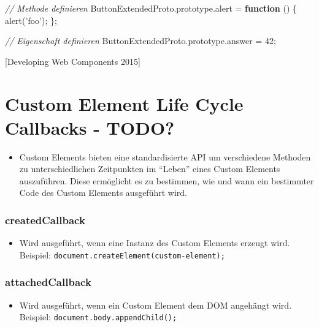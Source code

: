 \documentclass[11pt,a4paper]{report}
\newenvironment{Shaded}{}{}
\newcommand{\KeywordTok}[1]{\textcolor[rgb]{0.00,0.44,0.13}{\textbf{{#1}}}}
\newcommand{\DecValTok}[1]{\textcolor[rgb]{0.25,0.63,0.44}{{#1}}}
\newcommand{\StringTok}[1]{\textcolor[rgb]{0.25,0.44,0.63}{{#1}}}
\newcommand{\CommentTok}[1]{\textcolor[rgb]{0.38,0.63,0.69}{\textit{{#1}}}}
\newcommand{\VariableTok}[1]{\textcolor[rgb]{0.10,0.09,0.49}{{#1}}}
\newcommand{\OperatorTok}[1]{\textcolor[rgb]{0.40,0.40,0.40}{{#1}}}
\newcommand{\AttributeTok}[1]{\textcolor[rgb]{0.49,0.56,0.16}{{#1}}}
\newcommand{\NormalTok}[1]{{#1}}
\providecommand{\tightlist}{%
  \setlength{\itemsep}{0pt}\setlength{\parskip}{0pt}}
\begin{document}
\begin{Shaded}
\begin{Highlighting}[]
\CommentTok{// Methode definieren}
\VariableTok{ButtonExtendedProto}\NormalTok{.}\VariableTok{prototype}\NormalTok{.}\AttributeTok{alert} \OperatorTok{=} \KeywordTok{function} \NormalTok{() }\OperatorTok{\{}
  \AttributeTok{alert}\NormalTok{(}\StringTok{'foo'}\NormalTok{)}\OperatorTok{;}
\OperatorTok{\};}

\CommentTok{// Eigenschaft definieren}
\VariableTok{ButtonExtendedProto}\NormalTok{.}\VariableTok{prototype}\NormalTok{.}\AttributeTok{answer} \OperatorTok{=} \DecValTok{42}\OperatorTok{;}
\end{Highlighting}
\end{Shaded}

{[}Developing Web Components 2015{]}

\section{Custom Element Life Cycle Callbacks -
TODO?}\label{custom-element-life-cycle-callbacks---todo}

\begin{itemize}
\tightlist
\item
  Custom Elements bieten eine standardisierte API um verschiedene
  Methoden zu unterschiedlichen Zeitpunkten im ``Leben'' eines Custom
  Elements auszuführen. Diese ermöglicht es zu bestimmen, wie und wann
  ein bestimmter Code des Custom Elements ausgeführt wird.
\end{itemize}

\subsubsection{createdCallback}\label{createdcallback}

\begin{itemize}
\tightlist
\item
  Wird ausgeführt, wenn eine Instanz des Custom Elements erzeugt wird.
  Beispiel:
  \texttt{document.createElement(\textquotesingle{}custom-element\textquotesingle{});}
\end{itemize}

\subsubsection{attachedCallback}\label{attachedcallback}

\begin{itemize}
\tightlist
\item
  Wird ausgeführt, wenn ein Custom Element dem DOM angehängt wird.
  Beispiel: \texttt{document.body.appendChild();}
\end{itemize}
\end{document}
